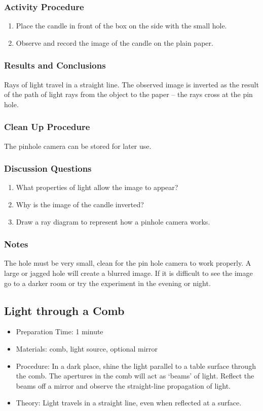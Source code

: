\subsubsection*{Activity Procedure}
\begin{enumerate}
\item{Place the candle in front of the box on the side with the small hole.} 
\item{Observe and record the image of the candle on the plain paper.} 
\end{enumerate}

\subsubsection*{Results and Conclusions}
Rays of light travel in a straight line. The observed image is inverted as the result of the path of light rays from the object to the paper -- the rays cross at the pin hole.

\subsubsection*{Clean Up Procedure}
The pinhole camera can be stored for later use.

\subsubsection*{Discussion Questions}
\begin{enumerate}
\item{What properties of light allow the image to appear?}
\item{Why is the image of the candle inverted?}
\item{Draw a ray diagram to represent how a pinhole camera works.}
\end{enumerate}

\subsubsection*{Notes}
The hole must be very small, clean for the pin hole camera to work properly. A large or jagged hole will create a blurred image.  
If it is difficult to see the image go to a darker room or try the experiment in the evening or night.


\subsection{Light through a Comb}
\begin{itemize}
\item{Preparation Time: 1 minute}
\item{Materials: comb, light source, optional mirror}
\item{Procedure: In a dark place, shine the light parallel to a table surface through the comb. The apertures in the comb will act as ‘beams’ of light. Reflect the beams off a mirror and observe the straight-line propagation of light.}
\item{Theory: Light travels in a straight line, even when reflected at a surface.}
\end{itemize}

